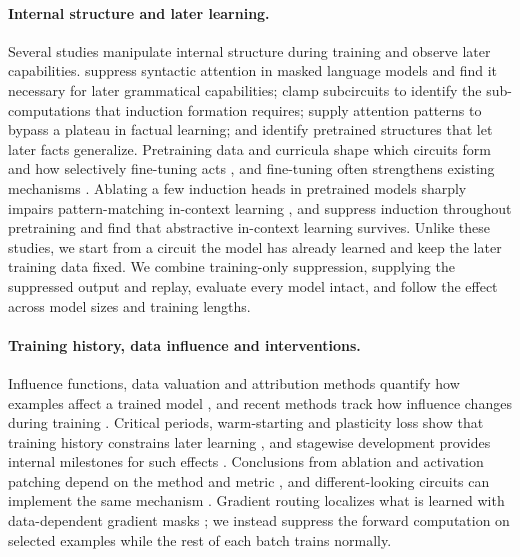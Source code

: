 \paragraph{Internal structure and later learning.}
Several studies manipulate internal structure during training and observe later
capabilities. \citet{chen2024sudden} suppress syntactic attention in masked language
models and find it necessary for later grammatical capabilities;
\citet{singh2024needs} clamp subcircuits to identify the sub-computations that
induction formation requires; \citet{zucchet2025facts} supply attention patterns to
bypass a plateau in factual learning; and \citet{feng2025extractive} identify
pretrained structures that let later facts generalize. Pretraining data and
curricula shape which circuits form and how selectively fine-tuning acts
\citep{bruijns2026curricula,chen2026mda,hu2025circuits}, and fine-tuning often
strengthens existing mechanisms \citep{prakash2024finetuning,jain2024mechanistically}.
Ablating a few induction heads in pretrained models sharply impairs pattern-matching
in-context learning \citep{crosbie2025induction}, and \citet{sahin2025hapax} suppress
induction throughout pretraining and find that abstractive in-context learning
survives. Unlike these studies, we start from a circuit the model has already
learned and keep the later training data fixed. We combine training-only
suppression, supplying the suppressed output and replay, evaluate every model
intact, and follow the effect across model sizes and training lengths.

\paragraph{Training history, data influence and interventions.}
Influence functions, data valuation and attribution methods quantify how examples
affect a trained model \citep{koh2017understanding,ghorbani2019data,ilyas2022datamodels,park2023trak},
and recent methods track how influence changes during training
\citep{wang2025temporal,lee2026influence,bae2024source}. Critical periods,
warm-starting and plasticity loss show that training history constrains later
learning \citep{achille2019critical,kleinman2024critical,ash2020warm,dohare2024loss,lyle2023plasticity},
and stagewise development provides internal milestones for such effects
\citep{hoogland2025degeneracy,singh2023transient,reddy2024mechanistic,chan2022data}.
Conclusions from ablation and activation patching depend on the method and metric
\citep{zhang2024patching,heimersheim2024patching,li2024optimal,miller2024faithfulness},
and different-looking circuits can implement the same mechanism
\citep{bayatmakou2026many}. Gradient routing localizes what is learned with
data-dependent gradient masks \citep{cloud2024gradient}; we instead suppress the
forward computation on selected examples while the rest of each batch trains
normally.

